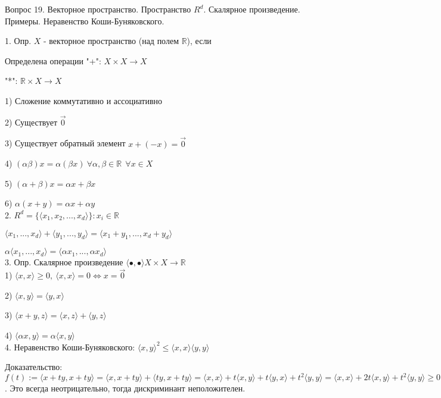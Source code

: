 \documentclass[12pt]{article}
\begin{document}
\begin{center}
Вопрос 19. Векторное пространство. Пространство $R^d$. Скалярное произведение. Примеры. Неравенство Коши-Буняковского.
\end{center}

1. Опр. $X$ - векторное пространство (над полем $\mathbb{R}$), если

Определена операции "+": $X\times X \to X$

"*": $\mathbb{R}\times X \to X$

1) Сложение коммутативно и ассоциативно

2) Существует $\overrightarrow{0}$

3) Существует обратный элемент $x+(-x)=\overrightarrow{0}$

4) $(\alpha \beta)x = \alpha(\beta x)\ \forall \alpha, \beta \in \mathbb{R}\ \ \forall x\in X$

5) $(\alpha+\beta)x = \alpha x + \beta x$

6) $\alpha(x+y) = \alpha x + \alpha y$\\

2. $R^d = \{ \langle x_1, x_2,...,x_d\rangle  \}: x_i \in \mathbb{R}$

$\langle x_1,...,x_d\rangle +\langle y_1,...,y_d\rangle =\langle x_1+y_1,..., x_d + y_d\rangle $

$\alpha \langle x_1,...,x_d\rangle  = \langle \alpha x_1,..., \alpha x_d\rangle $\\

3. Опр. Скалярное произведение $\langle \bullet, \bullet\rangle X\times X \to \mathbb{R}$\\

1) $\langle x, x\rangle \geq 0,\ \langle x, x\rangle =0 \Leftrightarrow x=\overrightarrow{0}$

2) $\langle x, y\rangle = \langle y, x\rangle$

3) $\langle x+y, z\rangle = \langle x, z\rangle + \langle y, z \rangle $

4) $\langle \alpha x, y\rangle = \alpha \langle x, y \rangle $\\

4. Неравенство Коши-Буняковского: $\langle x, y \rangle^2 \leq \langle x, x \rangle \langle y, y \rangle$

Доказательство:\\

$f(t):=\langle x+ty, x+ty\rangle = \langle x, x+ty \rangle + \langle ty, x+ty \rangle =\langle x, x \rangle + t\langle x, y \rangle + t\langle y, x \rangle + t^2\langle y, y \rangle = \langle x, x \rangle + 2t\langle x, y \rangle + t^2\langle y, y \rangle \geq 0$. Это всегда неотрицательно, тогда дискриминант неположителен.
\end{document}
